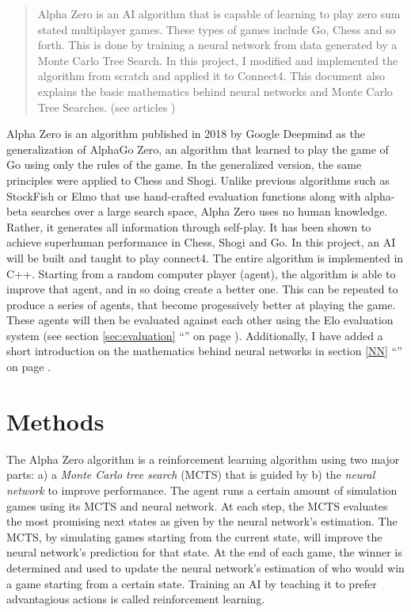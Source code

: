 \documentclass[12pt]{article}
\newcommand{\sectionref}[1]{section \ref{#1} ``\nameref{#1}'' on page \pageref{#1}}
\begin{document}
\maketitle
\begin{abstract}
\noindent Alpha Zero is an AI algorithm that is capable of learning to play zero sum stated multiplayer games. These types of games include Go, Chess and so forth. This is done by training a neural network from data generated by a Monte Carlo Tree Search. In this project, I modified and implemented the algorithm from scratch and applied it to Connect4. This document also explains the basic mathematics behind neural networks and Monte Carlo Tree Searches. (see articles \cite{silver2018general}\cite{silver2017mastering})
\end{abstract}
\newpage
\tableofcontents
\newpage

Alpha Zero is an algorithm published in 2018 by Google Deepmind as the generalization of AlphaGo Zero, an algorithm that learned to play the game of Go using only the rules of the game. In the generalized version, the same principles were applied to Chess and Shogi. Unlike previous algorithms such as StockFish or Elmo that use hand-crafted evaluation functions along with alpha-beta searches over a large search space, Alpha Zero uses no human knowledge. Rather, it generates all information through self-play. It has been shown to achieve superhuman performance in Chess, Shogi and Go. In this project, an AI will be built and taught to play connect4. The entire algorithm is implemented in C++. Starting from a random computer player (agent), the algorithm is able to improve that agent, and in so doing create a better one. This can be repeated to produce a series of agents, that become progessively better at playing the game. These agents will then be evaluated against each other using the Elo evaluation system \cite{elo1978rating} (see \sectionref{sec:evaluation}). Additionally, I have added a short introduction on the mathematics behind neural networks in \sectionref{NN}. 

\section{Methods}
\label{Methods}
The Alpha Zero algorithm is a reinforcement learning algorithm using two major parts: a) a {\it Monte Carlo tree search} (MCTS) that is guided by b) the {\it neural network} to improve performance.
The agent runs a certain amount of simulation games using its MCTS and neural network. At each step, the MCTS evaluates the most promising next states as given by the neural network's estimation. The MCTS, by simulating games starting from the current state, will improve the neural network's prediction for that state. At the end of each game, the winner is determined and used to update the neural network's estimation of who would win a game starting from a certain state. Training an AI by teaching it to prefer advantagious actions is called reinforcement learning.
\end{document}
